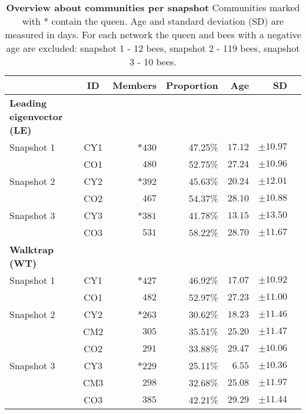 \begin{table}
\small
\centering
\caption[Overview about communities]{\textbf{Overview about communities per snapshot} Communities marked with * contain the queen. Age and standard deviation (SD) are measured in days. For each network the queen and bees with a negative age are excluded: snapshot 1 - 12 bees, snapshot 2 - 119 bees, snapshot 3 - 10 bees.}
\label{tab:communities}
\vspace*{5mm}
\begin{tabular}{lcrrrrr}
	\toprule
	{}  & ID & Members & Proportion & Age & SD\\
	\midrule

	\textbf{Leading eigenvector (LE)} &&&&&\\
	\midrule 
	Snapshot 1  & CY1 & $*430$  & 47.25\% & $17.12$ & $\pm10.97$ \\
	                 & CO1 & $480$   & 52.75\% & $27.24$ & $\pm10.96$ \\
	\midrule   							
	Snapshot 2  & CY2 & $*392$  & 45.63\% & $20.24$ & $\pm12.01$ \\
	                 & CO2 & $467$   & 54.37\% & $28.10$ & $\pm10.88$ \\
	\midrule  
	Snapshot 3  & CY3 & $*381$  & 41.78\% & $13.15$ & $\pm13.50$ \\
	                 & CO3 & $531$   & 58.22\% & $28.70$ & $\pm11.67$ \\
    \midrule

    \textbf{Walktrap (WT)} &&&&&\\
    \midrule 
	Snapshot 1 & CY1 & $*427$ & 46.92\% & $17.07$ & $\pm10.92$\\
	                & CO1 & $482$  & 52.97\% & $27.23$ & $\pm11.00$\\
	\midrule
	Snapshot 2 & CY2 & $*263$ & 30.62\% & $18.23$ & $\pm11.46$\\
				    & CM2 & $305$  & 35.51\% & $25.20$ & $\pm11.47$\\
				    & CO2 & $291$  & 33.88\% & $29.47$ & $\pm10.06$\\            
	\midrule
	Snapshot 3 & CY3 & $*229$  & 25.11\% & $6.55$  & $\pm10.36$\\
					& CM3 & $298$  & 32.68\% & $25.08$ & $\pm11.97$\\
					& CO3 & $385$  & 42.21\% & $29.29$ & $\pm11.44$\\
	\bottomrule
\end{tabular}
\end{table}